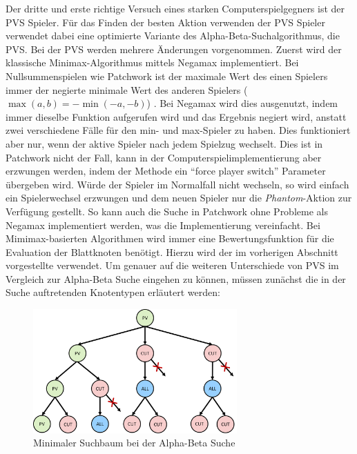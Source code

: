 Der dritte und erste richtige Versuch eines starken Computerspielgegners ist der \acl{PVS} Spieler. Für das Finden der besten Aktion verwenden der \acs{PVS} Spieler verwendet dabei eine optimierte Variante des Alpha-Beta-Suchalgorithmus, die \acf{PVS}. Bei der \ac{PVS} werden mehrere Änderungen vorgenommen. Zuerst wird der klassische Minimax-Algorithmus mittels Negamax implementiert. Bei Nullsummenspielen wie Patchwork ist der maximale Wert des einen Spielers immer der negierte minimale Wert des anderen Spielers ($\max\left(a,b\right) = -\min\left(-a,-b\right)$) \cite[S. 9]{2020.MinimaxTheorem}. Bei Negamax wird dies ausgenutzt, indem immer dieselbe Funktion aufgerufen wird und das Ergebnis negiert wird, anstatt zwei verschiedene Fälle für den min- und max-Spieler zu haben. Dies funktioniert aber nur, wenn der aktive Spieler nach jedem Spielzug wechselt. Dies ist in Patchwork nicht der Fall, kann in der Computerspielimplementierung aber erzwungen werden, indem der  Methode ein \enquote{force player switch} Parameter übergeben wird. Würde der Spieler im Normalfall nicht wechseln, so wird einfach ein Spielerwechsel erzwungen und dem neuen Spieler nur die \emph{Phantom}-Aktion zur Verfügung gestellt. So kann auch die Suche in Patchwork ohne Probleme als Negamax implementiert werden, was die Implementierung vereinfacht. Bei Mimimax-basierten Algorithmen wird immer eine Bewertungsfunktion für die Evaluation der Blattknoten benötigt. Hierzu wird der im vorherigen Abschnitt vorgestellte  verwendet. Um genauer auf die weiteren Unterschiede von \ac{PVS} im Vergleich zur Alpha-Beta Suche eingehen zu können, müssen zunächst die in der Suche auftretenden Knotentypen erläutert werden:

\vspace*{-0.45cm}

\begin{figure}[!ht]
    \centering
    \includegraphics[width=0.695\textwidth]{res/pictures/minimal-search-tree.pdf}
    \caption{Minimaler Suchbaum bei der Alpha-Beta Suche}
    \label{fig:minimal-search-tree}
\end{figure}

